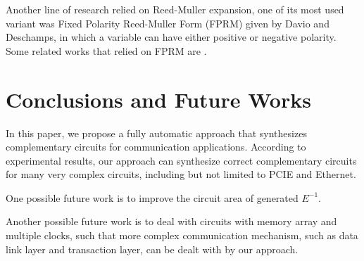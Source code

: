 \documentclass[journal]{IEEEtran}
\begin{document}
Another line of research relied on Reed-Muller expansion\cite{Reed},
one of its most used variant was Fixed Polarity Reed-Muller Form (FPRM) given by Davio and Deschamps\cite{FPRM},
in which a variable can have either positive or negative polarity.
Some related works that relied on FPRM are \cite{fastexactFPRM,fastOFDD,lowpowerXOR}.

\section{Conclusions and Future Works}\label{sec_con}

In this paper,
we propose a fully automatic approach that synthesizes complementary circuits for communication applications.
According to experimental results,
our approach can synthesize correct complementary circuits for many very complex circuits, including but not limited to PCIE and Ethernet.

One possible future work is to improve the circuit area of generated $E^{-1}$.

Another possible future work is to deal with circuits with memory array and multiple clocks,
such that more complex communication mechanism,
such as data link layer and transaction layer,
can be dealt with by our approach.

%
%
%
%
%
%
%
%
%
%
%


%
%
\end{document}
